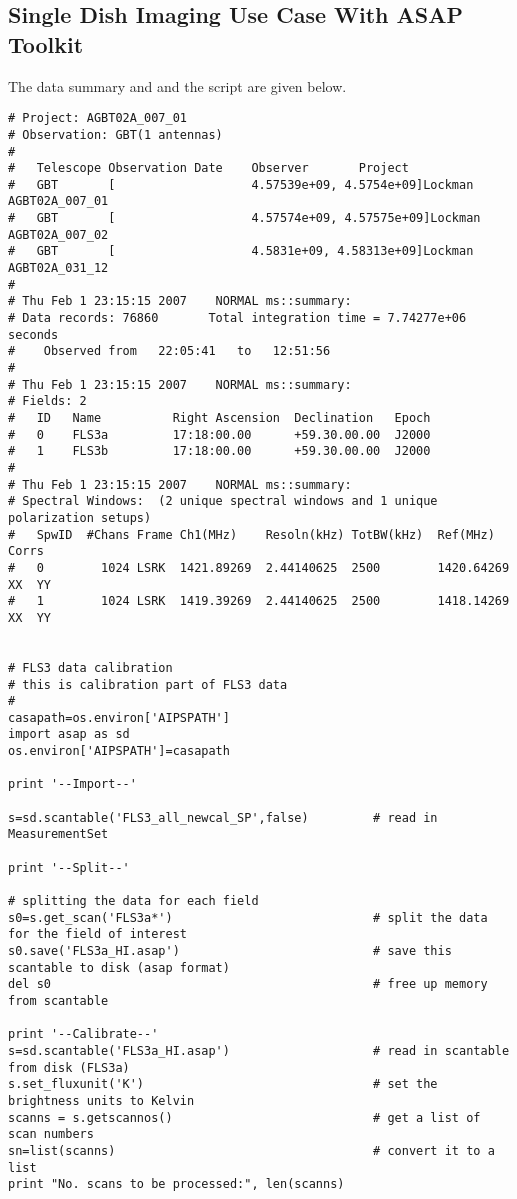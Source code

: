 \subsection{Single Dish Imaging Use Case With ASAP Toolkit}
\label{subsection:sd.imaging.usecase}

The data summary and and the script are given below. 

\small
\begin{verbatim}
# Project: AGBT02A_007_01
# Observation: GBT(1 antennas)
# 
#   Telescope Observation Date    Observer       Project
#   GBT       [                   4.57539e+09, 4.5754e+09]Lockman        AGBT02A_007_01
#   GBT       [                   4.57574e+09, 4.57575e+09]Lockman        AGBT02A_007_02
#   GBT       [                   4.5831e+09, 4.58313e+09]Lockman        AGBT02A_031_12
# 
# Thu Feb 1 23:15:15 2007    NORMAL ms::summary:
# Data records: 76860       Total integration time = 7.74277e+06 seconds
#    Observed from   22:05:41   to   12:51:56
# 
# Thu Feb 1 23:15:15 2007    NORMAL ms::summary:
# Fields: 2
#   ID   Name          Right Ascension  Declination   Epoch
#   0    FLS3a         17:18:00.00      +59.30.00.00  J2000
#   1    FLS3b         17:18:00.00      +59.30.00.00  J2000
# 
# Thu Feb 1 23:15:15 2007    NORMAL ms::summary:
# Spectral Windows:  (2 unique spectral windows and 1 unique polarization setups)
#   SpwID  #Chans Frame Ch1(MHz)    Resoln(kHz) TotBW(kHz)  Ref(MHz)    Corrs
#   0        1024 LSRK  1421.89269  2.44140625  2500        1420.64269  XX  YY
#   1        1024 LSRK  1419.39269  2.44140625  2500        1418.14269  XX  YY


# FLS3 data calibration
# this is calibration part of FLS3 data
#
casapath=os.environ['AIPSPATH']
import asap as sd
os.environ['AIPSPATH']=casapath

print '--Import--'

s=sd.scantable('FLS3_all_newcal_SP',false)         # read in MeasurementSet

print '--Split--'

# splitting the data for each field
s0=s.get_scan('FLS3a*')                            # split the data for the field of interest
s0.save('FLS3a_HI.asap')                           # save this scantable to disk (asap format)
del s0                                             # free up memory from scantable

print '--Calibrate--'
s=sd.scantable('FLS3a_HI.asap')                    # read in scantable from disk (FLS3a)
s.set_fluxunit('K')                                # set the brightness units to Kelvin
scanns = s.getscannos()                            # get a list of scan numbers
sn=list(scanns)                                    # convert it to a list
print "No. scans to be processed:", len(scanns)


\end{verbatim}

